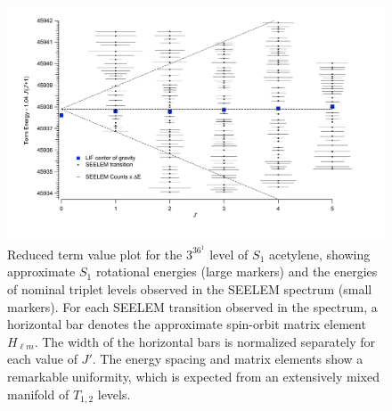 \documentclass[12pt]{mitthesis}
\begin{document}

\begin{figure}
  \caption{Reduced term value plot for the $3^36^1$  level of
    $S_1$ acetylene, showing approximate $S_1$ rotational energies
    (large markers) and the energies of nominal triplet levels
    observed in the SEELEM spectrum (small markers).  For each SEELEM
    transition observed in the spectrum, a horizontal bar denotes the
    approximate spin-orbit matrix element $H_{\ell m}$.  The width of
    the horizontal bars is normalized separately for each value of
    $J'$.  The energy spacing and matrix elements show a remarkable
    uniformity, which is expected from an extensively mixed manifold
    of $T_{1,2}$ levels.}
  \label{fig:unfold}
  \centering
  \vspace{10mm}
  \includegraphics[width=6.2in]{redterms-3361-unfolded}
\end{figure}

\end{document}
